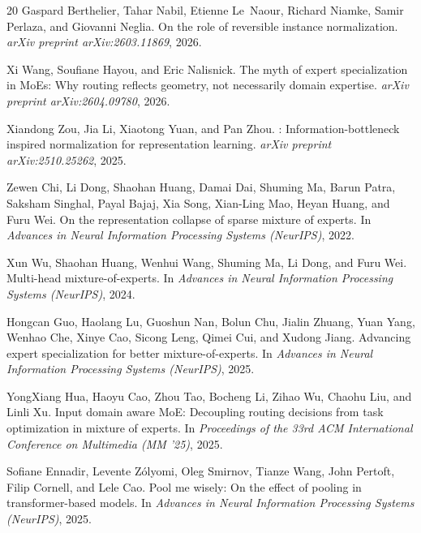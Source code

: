 \documentclass{article}
\begin{document}
\begin{thebibliography}{20}
Gaspard Berthelier, Tahar Nabil, Etienne Le~Naour, Richard Niamke, Samir Perlaza, and Giovanni Neglia.
\newblock On the role of reversible instance normalization.
\newblock \textit{arXiv preprint arXiv:2603.11869}, 2026.

Xi Wang, Soufiane Hayou, and Eric Nalisnick.
\newblock The myth of expert specialization in {MoEs}: Why routing reflects geometry, not necessarily domain expertise.
\newblock \textit{arXiv preprint arXiv:2604.09780}, 2026.

Xiandong Zou, Jia Li, Xiaotong Yuan, and Pan Zhou.
: Information-bottleneck inspired normalization for representation learning.
\newblock \textit{arXiv preprint arXiv:2510.25262}, 2025.

Zewen Chi, Li Dong, Shaohan Huang, Damai Dai, Shuming Ma, Barun Patra, Saksham Singhal, Payal Bajaj, Xia Song, Xian-Ling Mao, Heyan Huang, and Furu Wei.
\newblock On the representation collapse of sparse mixture of experts.
\newblock In \textit{Advances in Neural Information Processing Systems (NeurIPS)}, 2022.

Xun Wu, Shaohan Huang, Wenhui Wang, Shuming Ma, Li Dong, and Furu Wei.
\newblock Multi-head mixture-of-experts.
\newblock In \textit{Advances in Neural Information Processing Systems (NeurIPS)}, 2024.

Hongcan Guo, Haolang Lu, Guoshun Nan, Bolun Chu, Jialin Zhuang, Yuan Yang, Wenhao Che, Xinye Cao, Sicong Leng, Qimei Cui, and Xudong Jiang.
\newblock Advancing expert specialization for better mixture-of-experts.
\newblock In \textit{Advances in Neural Information Processing Systems (NeurIPS)}, 2025.

YongXiang Hua, Haoyu Cao, Zhou Tao, Bocheng Li, Zihao Wu, Chaohu Liu, and Linli Xu.
\newblock Input domain aware {MoE}: Decoupling routing decisions from task optimization in mixture of experts.
\newblock In \textit{Proceedings of the 33rd ACM International Conference on Multimedia (MM '25)}, 2025.

Sofiane Ennadir, Levente Z\'{o}lyomi, Oleg Smirnov, Tianze Wang, John Pertoft, Filip Cornell, and Lele Cao.
\newblock Pool me wisely: On the effect of pooling in transformer-based models.
\newblock In \textit{Advances in Neural Information Processing Systems (NeurIPS)}, 2025.


\end{thebibliography}
\end{document}
